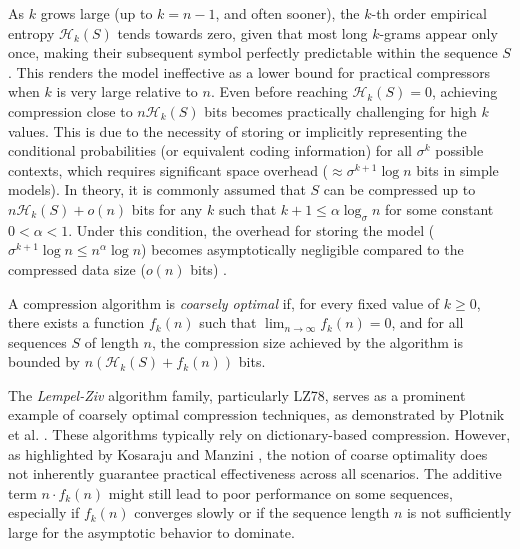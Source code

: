 \begin{remark}
    As $k$ grows large (up to $k=n-1$, and often sooner), the $k$-th order empirical entropy $\mathcal{H}_k(S)$ tends towards zero, given that most long $k$-grams appear only once, making their subsequent symbol perfectly predictable within the sequence $S$. This renders the model ineffective as a lower bound for practical compressors when $k$ is very large relative to $n$. Even before reaching $\mathcal{H}_k(S)=0$, achieving compression close to $n\mathcal{H}_k(S)$ bits becomes practically challenging for high $k$ values. This is due to the necessity of storing or implicitly representing the conditional probabilities (or equivalent coding information) for all $\sigma^k$ possible contexts, which requires significant space overhead ($\approx \sigma^{k+1} \log n$ bits in simple models). In theory, it is commonly assumed that $S$ can be compressed up to $n \mathcal{H}_k(S) + o(n)$ bits for any $k$ such that $k+1 \leq \alpha \log_\sigma n$ for some constant $0 < \alpha < 1$. Under this condition, the overhead for storing the model ($\sigma^{k+1} \log n \leq n^\alpha \log n$) becomes asymptotically negligible compared to the compressed data size ($o(n)$ bits) \cite{navarro2016compact}.
\end{remark}

\begin{definition} \label{def:coarsely_optimal_compression_algorithm}
    A compression algorithm is \emph{coarsely optimal} if, for every fixed value of $k \ge 0$, there exists a function $f_k(n)$ such that $\lim_{n\to\infty} f_k(n) = 0$, and for all sequences $S$ of length $n$, the compression size achieved by the algorithm is bounded by $n (\mathcal{H}_k(S) + f_k(n))$ bits.
\end{definition}

\noindent The \emph{Lempel-Ziv} algorithm family, particularly LZ78, serves as a prominent example of coarsely optimal compression techniques, as demonstrated by Plotnik et al. \cite{plotnik1992upper}. These algorithms typically rely on dictionary-based compression. However, as highlighted by Kosaraju and Manzini \cite{kosaraju2000compression}, the notion of coarse optimality does not inherently guarantee practical effectiveness across all scenarios. The additive term $n \cdot f_k(n)$ might still lead to poor performance on some sequences, especially if $f_k(n)$ converges slowly or if the sequence length $n$ is not sufficiently large for the asymptotic behavior to dominate.

